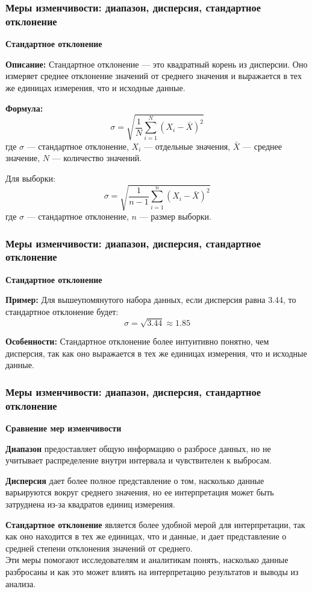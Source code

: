 \documentclass[aspectratio=169]{beamer}
\begin{document}
\begin{frame}
\frametitle{Меры изменчивости: диапазон, дисперсия, стандартное отклонение}
\textbf{Стандартное отклонение}

\textbf{Описание:} Стандартное отклонение — это квадратный корень из дисперсии. Оно измеряет среднее отклонение значений от среднего значения и выражается в тех же единицах измерения, что и исходные данные.

\textbf{Формула:}
  \[
  \sigma = \sqrt{ \frac{1}{N} \sum_{i=1}^{N} (X_i - \bar{X})^2}
  \]
где \(\sigma\) — стандартное отклонение, \(X_i\) — отдельные значения, \(\bar{X}\) — среднее значение, \(N\) — количество значений.


Для выборки:
  \[
   \sigma = \sqrt{ \frac{1}{n-1} \sum_{i=1}^{n} (X_i - \bar{X})^2}
  \]
где \(\sigma\) — стандартное отклонение, \(n\) — размер выборки.
\end{frame}

\begin{frame}
\frametitle{Меры изменчивости: диапазон, дисперсия, стандартное отклонение}
\textbf{Стандартное отклонение}

\textbf{Пример:} Для вышеупомянутого набора данных, если дисперсия равна 3.44, то стандартное отклонение будет:
  \[
  \sigma = \sqrt{3.44} \approx 1.85
  \]

\textbf{Особенности:} Стандартное отклонение более интуитивно понятно, чем дисперсия, так как оно выражается в тех же единицах измерения, что и исходные данные.
\end{frame}

\begin{frame}
\frametitle{Меры изменчивости: диапазон, дисперсия, стандартное отклонение}
\textbf{Сравнение мер изменчивости}

\textbf{Диапазон} предоставляет общую информацию о разбросе данных, но не учитывает распределение внутри интервала и чувствителен к выбросам.

\textbf{Дисперсия} дает более полное представление о том, насколько данные варьируются вокруг среднего значения, но ее интерпретация может быть затруднена из-за квадратов единиц измерения.

\textbf{Стандартное отклонение} является более удобной мерой для интерпретации, так как оно находится в тех же единицах, что и данные, и дает представление о средней степени отклонения значений от среднего.
\newline\\
Эти меры помогают исследователям и аналитикам понять, насколько данные разбросаны и как это может влиять на интерпретацию результатов и выводы из анализа.
\end{frame}
\end{document}
